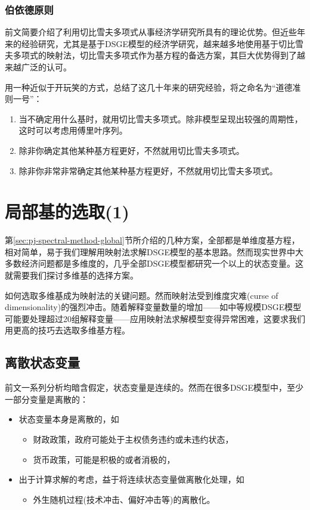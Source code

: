 \subsubsection{伯依德原则}
前文简要介绍了利用切比雪夫多项式从事经济学研究所具有的理论优势。但近些年来的经验研究，尤其是基于DSGE模型的经济学研究，越来越多地使用基于切比雪夫多项式的映射法，切比雪夫多项式作为基方程的备选方案，其巨大优势得到了越来越广泛的认可\citep{Aruoba:2006cz,Caldara:2012fr}。

\cite[p.10]{Boyd:2001wt}用一种近似于开玩笑的方式，总结了这几十年来的研究经验，将之命名为``道德准则一号''：
\begin{enumerate}
  \item 当不确定用什么基时，就用切比雪夫多项式。除非模型呈现出较强的周期性，这时可以考虑用傅里叶序列。
  \item 除非你确定其他某种基方程更好，不然就用切比雪夫多项式。
  \item 除非你非常非常确定其他某种基方程更好，不然就用切比雪夫多项式。
\end{enumerate}

\section{局部基的选取(1)}
\label{sec:pj-method-local}

第\ref{sec:pj-spectral-method-global}节所介绍的几种方案，全部都是单维度基方程，相对简单，易于我们理解用映射法求解DSGE模型的基本思路。然而现实世界中大多数经济问题都是多维度的，几乎全部DSGE模型都研究一个以上的状态变量。这就需要我们探讨多维基的选择方案。

如何选取多维基成为映射法的关键问题。然而映射法受到维度灾难(curse of dimensionality)的强烈冲击\citep{Bellman:1957tx}。随着解释变量数量的增加——如中等规模DSGE模型可能要处理超过20组解释变量——应用映射法求解模型变得异常困难，这要求我们用更高的技巧去选取多维基方程。

\subsection{离散状态变量}
\label{sec:pj-multidimen-discrete-state-variables}
前文一系列分析均暗含假定，状态变量是连续的。然而在很多DSGE模型中，至少一部分变量是离散的：
\begin{itemize}
  \item 状态变量本身是离散的，如
  \begin{itemize}
    \item 财政政策，政府可能处于主权债务违约或未违约状态\citep{Bocola:2016ij}，
    \item 货币政策，可能是积极的或者消极的\citep{Leeper:1991kq}，
  \end{itemize}
  \item 出于计算求解的考虑，益于将连续状态变量做离散化处理，如
  \begin{itemize}
    \item 外生随机过程(技术冲击、偏好冲击等)的离散化。
  \end{itemize}
\end{itemize}

